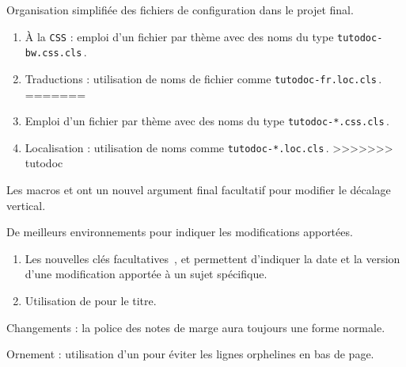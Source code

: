 \begin{tdoctech}
	\item Organisation simplifiée des fichiers de configuration dans le projet final.
	\begin{enumerate}
<<<<<<< HEAD
		\item À la \texttt{CSS} : emploi d'un fichier par thème avec des noms du type \texttt{tutodoc-bw.css.cls}\,.


		\item Traductions : utilisation de noms de fichier comme \texttt{tutodoc-fr.loc.cls}\,.
=======
		\item Emploi d'un fichier par thème avec des noms du type \texttt{tutodoc-*.css.cls}\,.


		\item Localisation : utilisation de noms comme \texttt{tutodoc-*.loc.cls}\,.
>>>>>>> tutodoc
	\end{enumerate}
\end{tdoctech}

\tdocsep




\begin{tdocnew}[version = 1.6.2, date = 2024-10-30]
	\item Les macros  et  ont un nouvel argument final facultatif  pour modifier le décalage vertical.

	\item De meilleurs environnements pour indiquer les modifications apportées.
	\begin{enumerate}
		\item Les nouvelles clés facultatives \,,  et  permettent d'indiquer la date et la version d'une modification apportée à un sujet spécifique.

		\item Utilisation de  pour le titre.
	\end{enumerate}
\end{tdocnew}


\begin{tdocupdate}
	\item Changements : la police des notes de marge aura toujours une forme normale.

	\item Ornement : utilisation d'un \tdoclatexin{\cleaders} pour éviter les lignes orphelines en bas de page.
\end{tdocupdate}

